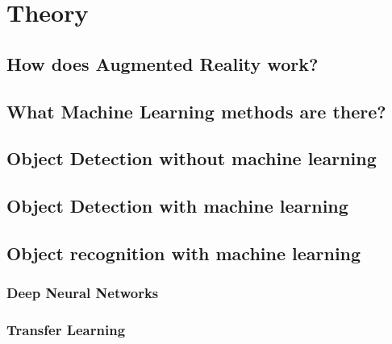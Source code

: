 \section{Theory}

\subsection{How does Augmented Reality work?}

\subsection{What Machine Learning methods are there?}

\subsection{Object Detection without machine learning}

\subsection{Object Detection with machine learning}

\subsection{Object recognition with machine learning}

\subsubsection{Deep Neural Networks}
\subsubsection{Transfer Learning}

\newpage
